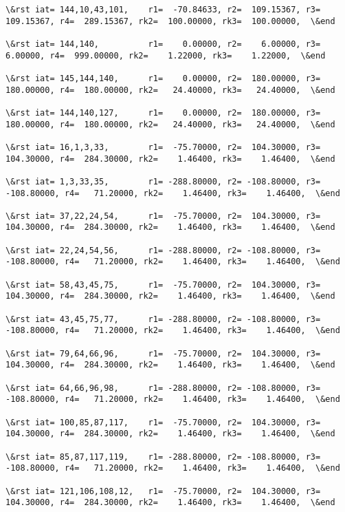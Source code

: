 \documentclass[11pt]{article}
\begin{document}
\begin{Verbatim}[commandchars=\\\{\}]
\&rst iat= 144,10,43,101,    r1=  -70.84633, r2=  109.15367, r3=  109.15367, r4=  289.15367, rk2=  100.00000, rk3=  100.00000,  \&end

\&rst iat= 144,140,          r1=    0.00000, r2=    6.00000, r3=    6.00000, r4=  999.00000, rk2=    1.22000, rk3=    1.22000,  \&end

\&rst iat= 145,144,140,      r1=    0.00000, r2=  180.00000, r3=  180.00000, r4=  180.00000, rk2=   24.40000, rk3=   24.40000,  \&end

\&rst iat= 144,140,127,      r1=    0.00000, r2=  180.00000, r3=  180.00000, r4=  180.00000, rk2=   24.40000, rk3=   24.40000,  \&end

\&rst iat= 16,1,3,33,        r1=  -75.70000, r2=  104.30000, r3=  104.30000, r4=  284.30000, rk2=    1.46400, rk3=    1.46400,  \&end

\&rst iat= 1,3,33,35,        r1= -288.80000, r2= -108.80000, r3= -108.80000, r4=   71.20000, rk2=    1.46400, rk3=    1.46400,  \&end

\&rst iat= 37,22,24,54,      r1=  -75.70000, r2=  104.30000, r3=  104.30000, r4=  284.30000, rk2=    1.46400, rk3=    1.46400,  \&end

\&rst iat= 22,24,54,56,      r1= -288.80000, r2= -108.80000, r3= -108.80000, r4=   71.20000, rk2=    1.46400, rk3=    1.46400,  \&end

\&rst iat= 58,43,45,75,      r1=  -75.70000, r2=  104.30000, r3=  104.30000, r4=  284.30000, rk2=    1.46400, rk3=    1.46400,  \&end

\&rst iat= 43,45,75,77,      r1= -288.80000, r2= -108.80000, r3= -108.80000, r4=   71.20000, rk2=    1.46400, rk3=    1.46400,  \&end

\&rst iat= 79,64,66,96,      r1=  -75.70000, r2=  104.30000, r3=  104.30000, r4=  284.30000, rk2=    1.46400, rk3=    1.46400,  \&end

\&rst iat= 64,66,96,98,      r1= -288.80000, r2= -108.80000, r3= -108.80000, r4=   71.20000, rk2=    1.46400, rk3=    1.46400,  \&end

\&rst iat= 100,85,87,117,    r1=  -75.70000, r2=  104.30000, r3=  104.30000, r4=  284.30000, rk2=    1.46400, rk3=    1.46400,  \&end

\&rst iat= 85,87,117,119,    r1= -288.80000, r2= -108.80000, r3= -108.80000, r4=   71.20000, rk2=    1.46400, rk3=    1.46400,  \&end

\&rst iat= 121,106,108,12,   r1=  -75.70000, r2=  104.30000, r3=  104.30000, r4=  284.30000, rk2=    1.46400, rk3=    1.46400,  \&end


\end{Verbatim}
\end{document}
